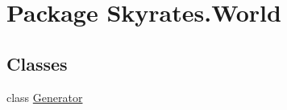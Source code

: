 \hypertarget{namespace_skyrates_1_1_world}{\section{Package Skyrates.\-World}
\label{namespace_skyrates_1_1_world}
}
\subsection*{Classes}
\begin{DoxyCompactItemize}
\item 
class \hyperlink{class_skyrates_1_1_world_1_1_generator}{Generator}
\end{DoxyCompactItemize}
